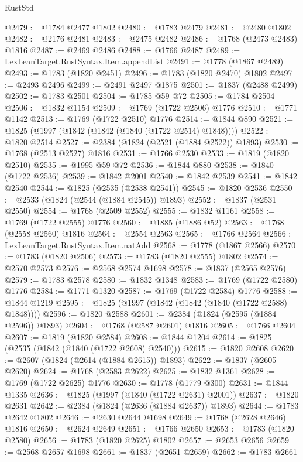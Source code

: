 \begin{lexlean}{RustStd}
\begin{coremodule}
@2479 := @1784 @2477 @1802
@2480 := @1783 @2479
@2481 := @2480 @1802
@2482 := @2176 @2481
@2483 := @2475 @2482
@2486 := @1768 (@2473 @2483) @1816
@2487 := @2469 @2486
@2488 := @1766 @2487
@2489 := LexLeanTarget.RustSyntax.Item.appendList
@2491 := @1778 (@1867 @2489)
@2493 := @1783 (@1820 @2451)
@2496 := @1783 (@1820 @2470) @1802
@2497 := @2493 @2496
@2499 := @2491 @2497 @1875
@2501 := @1837 (@2488 @2499)
@2502 := @1783 @2501
@2504 := @1785 @59 @72
@2505 := @1784 @2504
@2506 := @1832 @1154
@2509 := @1769 (@1722 @2506) @1776
@2510 := @1771 @1142
@2513 := @1769 (@1722 @2510) @1776
@2514 := @1844 @890
@2521 := @1825 (@1997 (@1842 (@1842 (@1840 (@1722 @2514) @1848))))
@2522 := @1820 @2514
@2527 := @2384 (@1824 (@2521 (@1884 @2522)) @1893)
@2530 := @1768 (@2513 @2527) @1816
@2531 := @1766 @2530
@2533 := @1819 (@1820 @2510)
@2535 := @1995 @59 @72
@2536 := @1844 @880
@2538 := @1840 (@1722 @2536)
@2539 := @1842 @2001
@2540 := @1842 @2539
@2541 := @1842 @2540
@2544 := @1825 (@2535 (@2538 @2541))
@2545 := @1820 @2536
@2550 := @2533 (@1824 (@2544 (@1884 @2545)) @1893)
@2552 := @1837 (@2531 @2550)
@2554 := @1768 (@2509 @2552)
@2555 := @1832 @1161
@2558 := @1769 (@1722 @2555) @1776
@2560 := @1885 (@1886 @52)
@2563 := @1768 (@2558 @2560) @1816
@2564 := @2554 @2563
@2565 := @1766 @2564
@2566 := LexLeanTarget.RustSyntax.Item.natAdd
@2568 := @1778 (@1867 @2566)
@2570 := @1783 (@1820 @2506)
@2573 := @1783 (@1820 @2555) @1802
@2574 := @2570 @2573
@2576 := @2568 @2574 @1698
@2578 := @1837 (@2565 @2576)
@2579 := @1783 @2578
@2580 := @1832 @1348
@2583 := @1769 (@1722 @2580) @1776
@2584 := @1771 @1320
@2587 := @1769 (@1722 @2584) @1776
@2588 := @1844 @1219
@2595 := @1825 (@1997 (@1842 (@1842 (@1840 (@1722 @2588) @1848))))
@2596 := @1820 @2588
@2601 := @2384 (@1824 (@2595 (@1884 @2596)) @1893)
@2604 := @1768 (@2587 @2601) @1816
@2605 := @1766 @2604
@2607 := @1819 (@1820 @2584)
@2608 := @1844 @1204
@2614 := @1825 (@2535 (@1842 (@1840 (@1722 @2608) @2540)))
@2615 := @1820 @2608
@2620 := @2607 (@1824 (@2614 (@1884 @2615)) @1893)
@2622 := @1837 (@2605 @2620)
@2624 := @1768 (@2583 @2622)
@2625 := @1832 @1361
@2628 := @1769 (@1722 @2625) @1776
@2630 := @1778 (@1779 @300)
@2631 := @1844 @1335
@2636 := @1825 (@1997 (@1840 (@1722 @2631) @2001))
@2637 := @1820 @2631
@2642 := @2384 (@1824 (@2636 (@1884 @2637)) @1893)
@2644 := @1783 @2642 @1802
@2646 := @2630 @2644 @1698
@2649 := @1768 (@2628 @2646) @1816
@2650 := @2624 @2649
@2651 := @1766 @2650
@2653 := @1783 (@1820 @2580)
@2656 := @1783 (@1820 @2625) @1802
@2657 := @2653 @2656
@2659 := @2568 @2657 @1698
@2661 := @1837 (@2651 @2659)
@2662 := @1783 @2661

\end{coremodule}
\end{lexlean}
